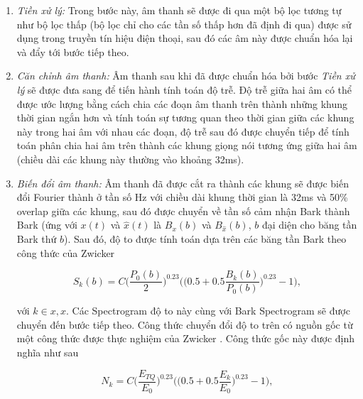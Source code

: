 			\begin{enumerate}[1.]
				\item \textit{Tiền xử lý:} Trong bước này, âm thanh sẽ được đi qua một bộ lọc tương tự như bộ lọc thấp (bộ lọc chỉ cho các tần số thấp hơn đã định đi qua) được sử dụng trong truyền tín hiệu điện thoại, sau đó các âm này được chuẩn hóa lại và đẩy tới bước tiếp theo.
				
				\item \textit{Căn chỉnh âm thanh:} Âm thanh sau khi đã được chuẩn hóa bởi bước \textit{Tiền xử lý} sẽ được đưa sang để tiến hành tính toán độ trễ. Độ trễ giữa hai âm có thể được ước lượng bằng cách chia các đoạn âm thanh trên thành những khung thời gian ngắn hơn và tính toán sự tương quan theo thời gian giữa các khung này trong hai âm với nhau các đoạn, độ trễ sau đó được chuyển tiếp để tính toán phân chia hai âm trên thành các khung giọng nói tương ứng giữa hai âm (chiều dài các khung này thường vào khoảng 32ms).
				
				\item \textit{Biến đổi âm thanh:} Âm thanh đã được cắt ra thành các khung sẽ được biến đổi Fourier thành \spectrogram{} ở tần số Hz với chiều dài khung thời gian là 32ms và 50\% overlap giữa các khung, sau đó được chuyển về tần số cảm nhận Bark thành Bark \spectrogram{} (ứng với $x(t)$ và $\hat{x}(t)$ là $B_x(b)$ và $B_{\hat{x}}(b)$, $b$ đại diện cho băng tần Bark thứ $b$). Sau đó, \spectrogram{} độ to được tính toán dựa trên các băng tần Bark theo công thức của Zwicker \cite{speech_enhancement}
					
					\begin{equation}
						S_k(b) = C \bigg( \frac{P_0(b)}{2} \bigg)^{0.23} \bigg( \bigg( 0.5 + 0.5\frac{B_k(b)}{P_0(b)} \bigg)^{0.23} - 1 \bigg),
					\end{equation}
					
				\noindent với $k \in {x, \hat{x}}$. Các Spectrogram độ to này cùng với Bark Spectrogram sẽ được chuyển đến bước tiếp theo. Công thức chuyển đổi độ to trên có nguồn gốc từ một công thức được thực nghiệm của Zwicker \cite{psychoacoustics}. Công thức gốc này được định nghĩa như sau
				
					\begin{equation}
						N_k = C \bigg( \frac{E_{TQ}}{E_0} \bigg)^{0.23} \bigg( \bigg( 0.5 + 0.5\frac{E_k}{E_0} \bigg)^{0.23} - 1 \bigg),
					\end{equation}
					

\end{enumerate}
